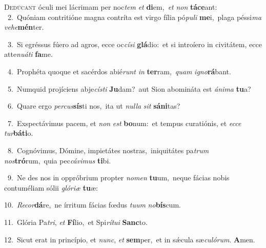 \lettrine{\initial\textcolor{\initialcolor}{D}}{edúcant} óculi mei lácrimam per noc\textit{tem} \textit{et} \textbf{di}\-em,~\star \textit{et} \textit{non} \textbf{tá}\-\textbf{ce}ant:\\
{\numbfont\textcolor{\numbcolor}{~2.}}~Quóniam contritióne magna contríta est virgo fília pó\-\textit{pu}\-\textit{li} \textbf{me}\-i,~\star plaga péssi\textit{ma} \textit{ve}\-\textit{he}\textbf{mén}ter.\par
{\numbfont\textcolor{\numbcolor}{~3.}}~Si egréssus fúero ad agros, ecce oc\-\textit{cí}\-\textit{si} \textbf{glá}\-dio:~\star et si introíero in civitátem, ecce atte\-\textit{nu}\-\textit{á}\textit{ti} \textbf{fa}\-me.\par
{\numbfont\textcolor{\numbcolor}{~4.}}~Prophéta quoque et sacérdos abié\textit{runt} \textit{in} \textbf{ter}\-ram,~\star \textit{quam} \textit{i}\-\textit{gno}\textbf{rá}bant.\par
{\numbfont\textcolor{\numbcolor}{~5.}}~Numquid projíciens abje\-\textit{cís}\-\textit{ti} \textbf{Ju}\-dam?~\star aut Sion abomináta est \textit{á}\-\textit{ni}\textit{ma} \textbf{tu}\-a?\par
{\numbfont\textcolor{\numbcolor}{~6.}}~Quare ergo \textit{per}\-\textit{cus}\textbf{sís}ti nos,~\star ita ut \textit{nul}\-\textit{la} \textit{sit} \textbf{sá}\-\textbf{ni}tas?\par
{\numbfont\textcolor{\numbcolor}{~7.}}~Exspectávimus pacem, et \textit{non} \textit{est} \textbf{bo}\-num:~\star et tempus curatiónis, et \textit{ec}\-\textit{ce} \textit{tur}\-\textbf{bá}\textbf{ti}o.\par
{\numbfont\textcolor{\numbcolor}{~8.}}~Cognóvimus, Dómine, impietátes nostras,~\dagger iniquitátes pa\textit{trum} \textit{nos}\-\textbf{tró}rum,~\star quia pec\-\textit{cá}\-\textit{vi}\textit{mus} \textbf{ti}\-bi.\par
{\numbfont\textcolor{\numbcolor}{~9.}}~Ne des nos in oppróbrium propter \textit{no}\-\textit{men} \textbf{tu}\-um,~\star neque fácias nobis contuméliam sólii \textit{gló}\-\textit{ri}\textit{æ} \textbf{tu}\-æ:\par
{\numbfont\textcolor{\numbcolor}{10.}}~\-\textit{Re}\-\textit{cor}\textbf{dá}re,~\star ne írritum fácias fœdus \textit{tu}\-\textit{um} \textit{no}\-\textbf{bís}cum.\par
{\numbfont\textcolor{\numbcolor}{11.}}~Glória Pa\-\textit{tri}\-, \textit{et} \textbf{Fí}\-lio,~\star et Spi\-\textit{rí}\-\textit{tu}\textit{i} \textbf{Sanc}\-to.\par
{\numbfont\textcolor{\numbcolor}{12.}}~Sicut erat in princípio, et \textit{nunc}\-, \textit{et} \textbf{sem}\-per,~\star et in sǽcula sæ\-\textit{cu}\-\textit{ló}\textit{rum}. \textbf{A}\-men.\par
